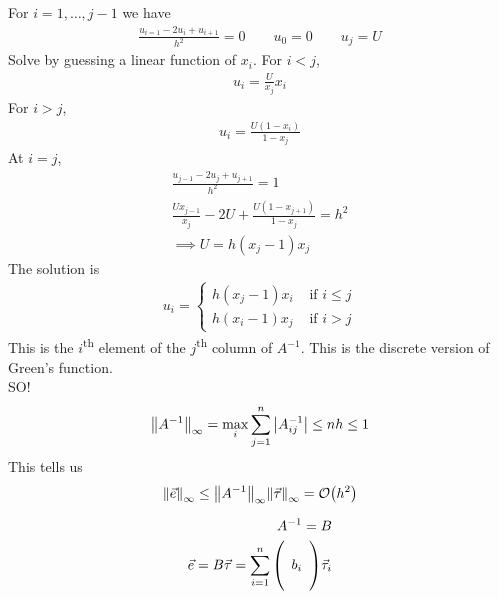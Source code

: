 \documentclass{article}
\begin{document}
            For $i = 1, \dots, j - 1$ we have
            \begin{align}
                \frac{u_{i=1} - 2u_i + u_{i+1}}{h^2} = 0 \qquad u_0 = 0 \qquad u_j = U
            \end{align}
            Solve by guessing a linear function of $x_i$.  For $i < j$,
            \begin{align}
                u_i = \frac{U}{x_j}x_i
            \end{align}
            For $i > j$,
            \begin{align}
                u_i = \frac{U(1 - x_i)}{1 - x_j}
            \end{align}
            At $i = j$,
            \begin{align}
                \frac{u_{j-1} - 2u_j + u_{j+1}}{h^2} = 1 \\
                \frac{Ux_{j-1}}{x_j} - 2U + \frac{U(1 - x_{j+1})}{1 - x_j} = h^2 \\
                \implies U = h(x_j - 1)x_j
            \end{align}
            The solution is
            \begin{align}
                u_i = \begin{cases}
                    h(x_j - 1)x_i & \text{ if } i \leq j \\
                    h(x_i - 1)x_j & \text{ if } i > j
                \end{cases}
            \end{align}
            This is the $i$\textsuperscript{th} element of the $j$\textsuperscript{th} column of $A^{-1}$.  This is the discrete version of Green's function. \\

            SO! \\

            \begin{align}
                \norm{A^{-1}}_\infty = \max_i \sum_{j=1}^n \abs{A^{-1}_{ij}} \leq nh \leq 1
            \end{align}
            This tells us
            \begin{align}
                \norm{\vec{e}}_\infty \leq \norm{A^{-1}}_\infty \norm{\vec{\tau}}_\infty = \order{h^2}
            \end{align}

            \begin{align}
                A^{-1} = B \\
                \vec{e} = B\vec{\tau} = \sum_{i=1}^n\qty(\begin{array}{c} \hphantom{\cdot} \\ b_i \\ \hphantom{\cdot} \end{array})\vec{\tau}_i
            \end{align}
\end{document}
